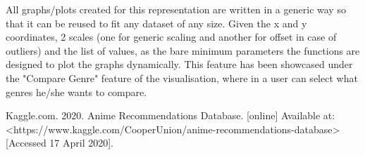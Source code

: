 \documentclass[a4paper, 10pt]{article}
\begin{document}
\qquad All graphs/plots created for this representation are written in a generic way so that it can be reused to fit any dataset of any size. Given the x and y coordinates, 2 scales (one for generic scaling and another for offset in case of outliers) and the list of values, as the bare minimum parameters the functions are designed to plot the graphs dynamically. This feature has been showcased under the "Compare Genre" feature of the visualisation, where in a user can select what genres he/she wants to compare.


\begin{thebibliography}{9}
Kaggle.com. 2020. Anime Recommendations Database. [online] Available at: <https://www.kaggle.com/CooperUnion/anime-recommendations-database> [Accessed 17 April 2020].

\end{thebibliography}
\end{document}

